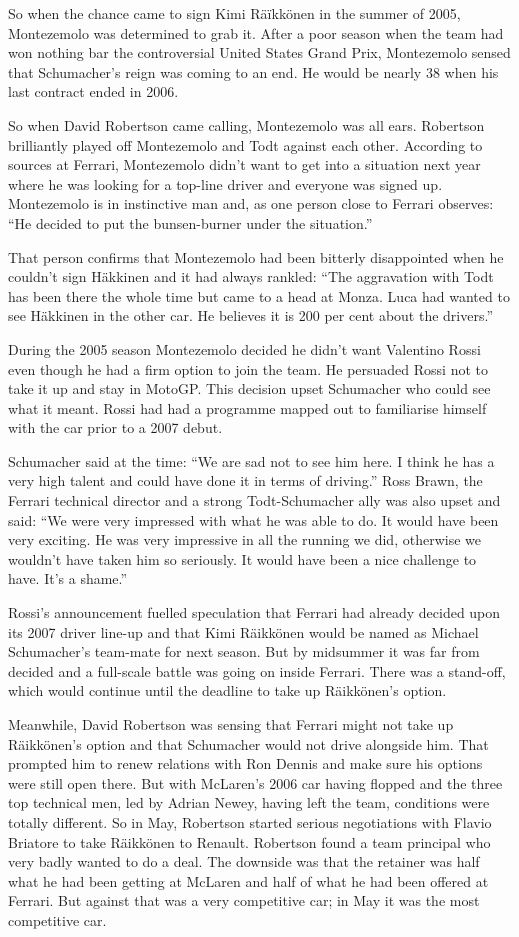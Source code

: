 \documentclass{article}
\begin{document}
So when the chance came to sign Kimi Räïkkönen in the summer of 2005, Montezemolo was determined to grab it. After a poor season when the team had won nothing bar the controversial United States Grand Prix, Montezemolo sensed that Schumacher’s reign was coming to an end. He would be nearly 38 when his last contract ended in 2006.

So when David Robertson came calling, Montezemolo was all ears. Robertson brilliantly played off Montezemolo and Todt against each other. According to sources at Ferrari, Montezemolo didn’t want to get into a situation next year where he was looking for a top-line driver and everyone was signed up. Montezemolo is in instinctive man and, as one person close to Ferrari observes: “He decided to put the bunsen-burner under the situation.”

That person confirms that Montezemolo had been bitterly disappointed when he couldn’t sign Häkkinen and it had always rankled: “The aggravation with Todt has been there the whole time but came to a head at Monza. Luca had wanted to see Häkkinen in the other car. He believes it is 200 per cent about the drivers.”

During the 2005 season Montezemolo decided he didn’t want Valentino Rossi even though he had a firm option to join the team. He persuaded Rossi not to take it up and stay in MotoGP. This decision upset Schumacher who could see what it meant. Rossi had had a programme mapped out to familiarise himself with the car prior to a 2007 debut.

Schumacher said at the time: “We are sad not to see him here. I think he has a very high talent and could have done it in terms of driving.” Ross Brawn, the Ferrari technical director and a strong Todt-Schumacher ally was also upset and said: “We were very impressed with what he was able to do. It would have been very exciting. He was very impressive in all the running we did, otherwise we wouldn’t have taken him so seriously. It would have been a nice challenge to have. It’s a shame.”

Rossi’s announcement fuelled speculation that Ferrari had already decided upon its 2007 driver line-up and that Kimi Räikkönen would be named as Michael Schumacher’s team-mate for next season. But by midsummer it was far from decided and a full-scale battle was going on inside Ferrari. There was a stand-off, which would continue until the deadline to take up Räikkönen’s option.

Meanwhile, David Robertson was sensing that Ferrari might not take up Räikkönen’s option and that Schumacher would not drive alongside him. That prompted him to renew relations with Ron Dennis and make sure his options were still open there. But with McLaren’s 2006 car having flopped and the three top technical men, led by Adrian Newey, having left the team, conditions were totally different. So in May, Robertson started serious negotiations with Flavio Briatore to take Räikkönen to Renault. Robertson found a team principal who very badly wanted to do a deal. The downside was that the retainer was half what he had been getting at McLaren and half of what he had been offered at Ferrari. But against that was a very competitive car; in May it was the most competitive car.
\end{document}
